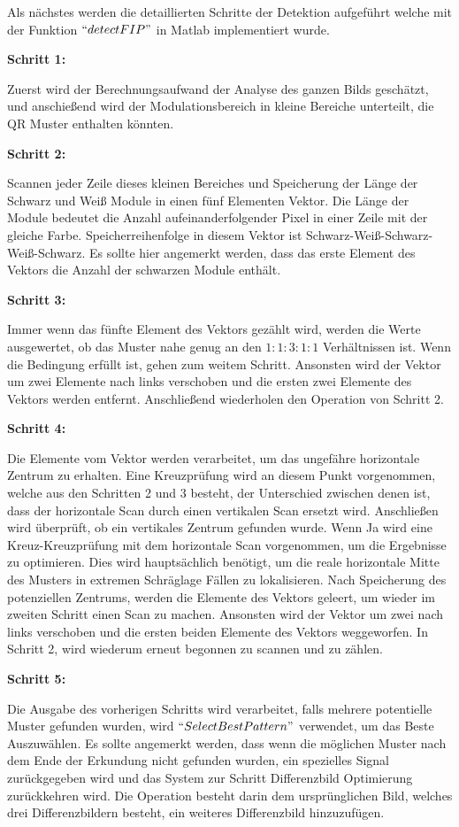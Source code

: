 Als nächstes werden die detaillierten Schritte der Detektion aufgeführt welche mit der Funktion $ ``detectFIP" $ in Matlab implementiert wurde.

\textbf{Schritt 1:}

Zuerst wird der Berechnungsaufwand der Analyse des ganzen Bilds geschätzt, und anschießend wird der Modulationsbereich in kleine Bereiche unterteilt, die QR Muster enthalten könnten.

\textbf{Schritt 2:}

Scannen jeder Zeile dieses kleinen Bereiches und Speicherung der Länge der Schwarz und Weiß Module in einen fünf Elementen Vektor. Die Länge der Module bedeutet die Anzahl aufeinanderfolgender Pixel in einer Zeile mit der gleiche Farbe. Speicherreihenfolge in diesem Vektor ist Schwarz-Weiß-Schwarz-Weiß-Schwarz. Es sollte hier angemerkt werden, dass das erste Element des Vektors die Anzahl der schwarzen Module enthält. 

\textbf{Schritt 3:}

Immer wenn das fünfte Element des Vektors gezählt wird, werden die Werte ausgewertet, ob das Muster nahe genug an den $1:1:3:1:1$ Verhältnissen ist. Wenn die Bedingung erfüllt ist, gehen zum weitem Schritt. Ansonsten wird der Vektor um zwei Elemente nach links verschoben und die ersten zwei Elemente des Vektors werden entfernt. Anschließend wiederholen den Operation von Schritt 2.
              

\textbf{Schritt 4:}

Die Elemente vom Vektor werden verarbeitet, um das ungefähre horizontale Zentrum zu erhalten. Eine Kreuzprüfung wird an diesem Punkt vorgenommen, welche aus den Schritten 2 und 3 besteht, der Unterschied zwischen denen ist, dass der horizontale Scan durch einen vertikalen Scan ersetzt wird. Anschließen wird überprüft, ob ein vertikales Zentrum gefunden wurde. Wenn Ja wird eine Kreuz-Kreuzprüfung mit dem horizontale Scan vorgenommen, um die Ergebnisse zu optimieren. Dies wird hauptsächlich benötigt, um die reale horizontale Mitte des Musters in extremen Schräglage Fällen zu lokalisieren. Nach Speicherung des potenziellen Zentrums, werden die Elemente des Vektors geleert, um wieder im zweiten Schritt einen Scan zu machen. Ansonsten wird der Vektor um zwei nach links verschoben und die ersten beiden Elemente des Vektors weggeworfen. In Schritt 2, wird wiederum erneut begonnen zu scannen und zu zählen.  

\textbf{Schritt 5:}

Die Ausgabe des vorherigen Schritts wird verarbeitet, falls mehrere potentielle Muster gefunden wurden, wird $ ``Select Best Pattern" $ verwendet, um das Beste Auszuwählen. Es sollte angemerkt werden, dass wenn die möglichen Muster nach dem Ende der Erkundung nicht gefunden wurden, ein spezielles Signal zurückgegeben wird und das System zur Schritt Differenzbild Optimierung zurückkehren wird. Die Operation besteht darin dem ursprünglichen Bild, welches drei Differenzbildern besteht, ein weiteres Differenzbild hinzuzufügen.
                       
